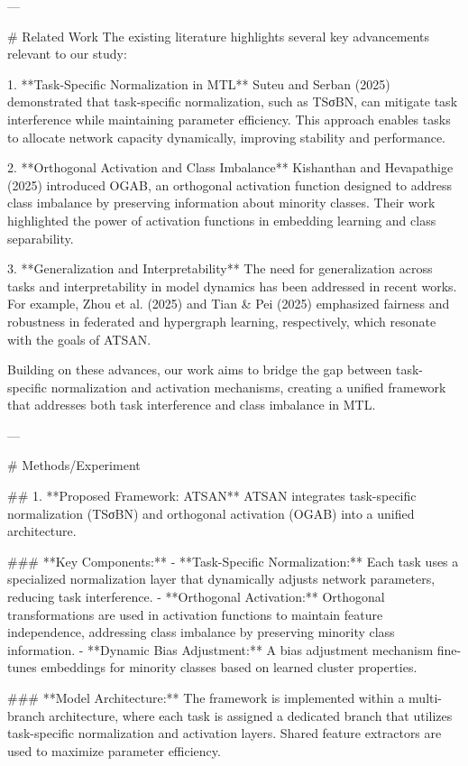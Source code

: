 ---

# Related Work  
The existing literature highlights several key advancements relevant to our study:  

1. **Task-Specific Normalization in MTL**  
   Suteu and Serban (2025) demonstrated that task-specific normalization, such as TSσBN, can mitigate task interference while maintaining parameter efficiency. This approach enables tasks to allocate network capacity dynamically, improving stability and performance.  

2. **Orthogonal Activation and Class Imbalance**  
   Kishanthan and Hevapathige (2025) introduced OGAB, an orthogonal activation function designed to address class imbalance by preserving information about minority classes. Their work highlighted the power of activation functions in embedding learning and class separability.  

3. **Generalization and Interpretability**  
   The need for generalization across tasks and interpretability in model dynamics has been addressed in recent works. For example, Zhou et al. (2025) and Tian & Pei (2025) emphasized fairness and robustness in federated and hypergraph learning, respectively, which resonate with the goals of ATSAN.  

Building on these advances, our work aims to bridge the gap between task-specific normalization and activation mechanisms, creating a unified framework that addresses both task interference and class imbalance in MTL.

---

# Methods/Experiment  

## 1. **Proposed Framework: ATSAN**  
ATSAN integrates task-specific normalization (TSσBN) and orthogonal activation (OGAB) into a unified architecture.  

### **Key Components:**  
- **Task-Specific Normalization:** Each task uses a specialized normalization layer that dynamically adjusts network parameters, reducing task interference.  
- **Orthogonal Activation:** Orthogonal transformations are used in activation functions to maintain feature independence, addressing class imbalance by preserving minority class information.  
- **Dynamic Bias Adjustment:** A bias adjustment mechanism fine-tunes embeddings for minority classes based on learned cluster properties.  

### **Model Architecture:**  
The framework is implemented within a multi-branch architecture, where each task is assigned a dedicated branch that utilizes task-specific normalization and activation layers. Shared feature extractors are used to maximize parameter efficiency.  

